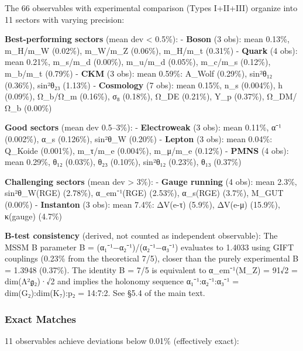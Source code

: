 \documentclass[11pt,a4paper]{article}
\begin{document}
{{{The 66 observables with experimental comparison (Types I+II+III) organize into 11 sectors with varying precision:

\textbf{Best-performing sectors} (mean dev \textless{} 0.5\%):
- \textbf{Boson} (3 obs): mean 0.13\%, m\_H/m\_W (0.02\%), m\_W/m\_Z (0.06\%), m\_H/m\_t (0.31\%)
- \textbf{Quark} (4 obs): mean 0.21\%, m\_s/m\_d (0.00\%), m\_u/m\_d (0.05\%), m\_c/m\_s (0.12\%), m\_b/m\_t (0.79\%)
- \textbf{CKM} (3 obs): mean 0.59\%: A\_Wolf (0.29\%), sin²θ₁₂ (0.36\%), sin²θ₂₃ (1.13\%)
- \textbf{Cosmology} (7 obs): mean 0.15\%, n\_s (0.004\%), h (0.09\%), Ω\_b/Ω\_m (0.16\%), σ₈ (0.18\%), Ω\_DE (0.21\%), Y\_p (0.37\%), Ω\_DM/Ω\_b (0.00\%)

\textbf{Good sectors} (mean dev 0.5--3\%):
- \textbf{Electroweak} (3 obs): mean 0.11\%, α⁻¹ (0.002\%), α\_s (0.126\%), sin²θ\_W (0.20\%)
- \textbf{Lepton} (3 obs): mean 0.04\%: Q\_Koide (0.001\%), m\_τ/m\_e (0.004\%), m\_μ/m\_e (0.12\%)
- \textbf{PMNS} (4 obs): mean 0.29\%, θ₁₂ (0.03\%), θ₂₃ (0.10\%), sin²θ₁₂ (0.23\%), θ₁₃ (0.37\%)

\textbf{Challenging sectors} (mean dev \textgreater{} 3\%):
- \textbf{Gauge running} (4 obs): mean 2.3\%, sin²θ\_W(RGE) (2.78\%), α\_em⁻¹(RGE) (2.53\%), α\_s(RGE) (3.7\%), M\_GUT (0.00\%)
- \textbf{Instanton} (3 obs): mean 7.4\%: ΔV(e-τ) (5.9\%), ΔV(e-μ) (15.9\%), κ(gauge) (4.7\%)

\textbf{B-test consistency} (derived, not counted as independent observable): The MSSM B parameter B = (α₁⁻¹−α₂⁻¹)/(α₂⁻¹−α₃⁻¹) evaluates to 1.4033 using GIFT couplings (0.23\% from the theoretical 7/5), closer than the purely experimental B = 1.3948 (0.37\%). The identity B = 7/5 is equivalent to α\_em⁻¹(M\_Z) = 91√2 = dim(Λ²$\mathfrak{g}$₂)·√2 and implies the holonomy sequence α₁⁻¹:α₂⁻¹:α₃⁻¹ = dim(G₂):dim(K₇):p₂ = 14:7:2. See §5.4 of the main text.

\subsubsection{Exact Matches}\label{exact-matches}

11 observables achieve deviations below 0.01\% (effectively exact):

}}}
\end{document}

